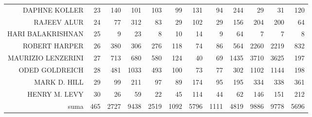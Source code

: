 \documentclass{bakalarka}
\begin{document}
\begin{table}[!ht]
\begin{sideways}
\begin{scriptsize}
\begin{tabular}{r|r|rrrrrrrrrr}
DAPHNE KOLLER&23&140&101&103&99&131&94&244&29&31&120\\
RAJEEV ALUR&24&77&312&83&29&102&29&156&204&200&64\\
HARI BALAKRISHNAN&25&9&23&8&10&14&9&64&7&7&8\\
ROBERT HARPER&26&380&306&276&118&74&86&564&2260&2219&832\\
MAURIZIO LENZERINI&27&713&680&580&124&40&69&1435&3710&3625&197\\
ODED GOLDREICH&28&481&1033&493&100&73&77&302&1102&1144&198\\
MARK D. HILL&29&99&211&97&89&174&95&195&334&338&361\\
HENRY M. LEVY&30&26&59&22&45&114&44&62&146&151&212\\
\midrule
suma&465&2727&9438&2519&1092&5796&1111&4819&9886&9778&5696\\
\bottomrule
\end{tabular}
\end{scriptsize}
\end{sideways}
\end{table}
\end{document}

